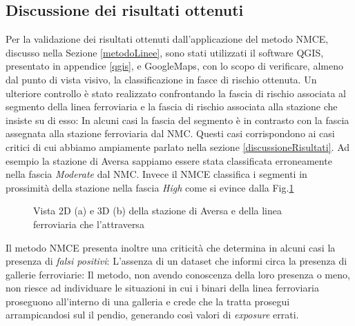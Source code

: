 \subsection{Discussione dei risultati ottenuti}
Per la validazione dei risultati ottenuti dall'applicazione del metodo NMCE, discusso nella Sezione \ref{metodoLinee}, sono stati utilizzati il software QGIS, presentato in appendice \ref{qgis}, e GoogleMaps, con lo scopo di verificare, almeno dal punto di vista visivo, la classificazione in fasce di rischio ottenuta. 
 Un ulteriore controllo è stato realizzato confrontando la fascia di rischio associata al segmento della linea ferroviaria e la fascia di rischio associata alla stazione che insiste su di esso: In alcuni casi la fascia del segmento è in contrasto con la fascia assegnata alla stazione ferroviaria dal NMC. Questi casi corrispondono ai casi critici di cui abbiamo ampiamente parlato nella sezione \ref{discussioneRisultati}. Ad esempio la stazione di Aversa sappiamo essere stata classificata erroneamente nella fascia \textit{Moderate} dal NMC. Invece il NMCE classifica i segmenti in prossimità della stazione nella fascia \textit{High} come si evince dalla Fig.\ref{aversalinea}
\begin{figure}[bth]
\myfloatalign
{} \quad
{} 
\caption{Vista $2$D (a) e $3$D (b) della stazione di Aversa e della linea ferroviaria che l’attraversa}\label{aversalinea}
\end{figure}
\newline
Il metodo NMCE presenta inoltre una criticità che determina in alcuni casi la presenza di \textit{falsi positivi}: L'assenza di un dataset che informi circa la presenza di gallerie ferroviarie: Il metodo, non avendo conoscenza della loro presenza o meno, non riesce ad individuare le situazioni in cui i binari della linea ferroviaria proseguono all'interno di una galleria e crede che la tratta prosegui arrampicandosi sul il pendio, generando così valori di \textit{exposure} errati.
